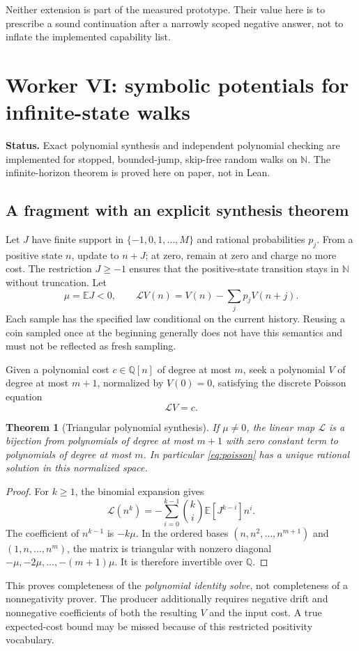 \documentclass[11pt,letterpaper]{article}
\newtheorem{theorem}{Theorem}[section]
\theoremstyle{definition}\newtheorem{definition}[theorem]{Definition}
\theoremstyle{remark}\newtheorem{remark}[theorem]{Remark}
\newcommand{\Q}{\mathbb Q}\newcommand{\R}{\mathbb R}\newcommand{\N}{\mathbb N}
\newcommand{\E}{\mathbb E}\newcommand{\Prob}{\mathbb P}
\newcommand{\status}[1]{\par\noindent\textbf{Status.} #1\par}
\begin{document}
Neither extension is part of the measured prototype. Their value here is to prescribe a sound continuation after a narrowly scoped negative answer, not to inflate the implemented capability list.

\section{Worker VI: symbolic potentials for infinite-state walks}
\status{Exact polynomial synthesis and independent polynomial checking are implemented for stopped, bounded-jump, skip-free random walks on $\N$. The infinite-horizon theorem is proved here on paper, not in Lean.}
\subsection{A fragment with an explicit synthesis theorem}
Let $J$ have finite support in $\{-1,0,1,\ldots,M\}$ and rational probabilities $p_j$. From a positive state $n$, update to $n+J$; at zero, remain at zero and charge no more cost. The restriction $J\ge-1$ ensures that the positive-state transition stays in $\N$ without truncation. Let
\[
 \mu=\E J<0,\qquad
 \mathcal L V(n)=V(n)-\sum_jp_jV(n+j).
\]
Each sample has the specified law conditional on the current history. Reusing a coin sampled once at the beginning generally does not have this semantics and must not be reflected as fresh sampling.

Given a polynomial cost $c\in\Q[n]$ of degree at most $m$, seek a polynomial $V$ of degree at most $m+1$, normalized by $V(0)=0$, satisfying the discrete Poisson equation
\begin{equation}\label{eq:poisson}
 \mathcal L V=c.
\end{equation}

\begin{theorem}[Triangular polynomial synthesis]\label{thm:triangular}
If $\mu\ne0$, the linear map $\mathcal L$ is a bijection from polynomials of degree at most $m+1$ with zero constant term to polynomials of degree at most $m$. In particular \eqref{eq:poisson} has a unique rational solution in this normalized space.
\end{theorem}
\begin{proof}
For $k\ge1$, the binomial expansion gives
\[
 \mathcal L(n^k)
 =-\sum_{i=0}^{k-1}\binom{k}{i}\E[J^{k-i}]n^i.
\]
The coefficient of $n^{k-1}$ is $-k\mu$. In the ordered bases $(n,n^2,\ldots,n^{m+1})$ and $(1,n,\ldots,n^m)$, the matrix is triangular with nonzero diagonal $-\mu,-2\mu,\ldots,-(m+1)\mu$. It is therefore invertible over $\Q$.
\end{proof}
This proves completeness of the \emph{polynomial identity solve}, not completeness of a nonnegativity prover. The producer additionally requires negative drift and nonnegative coefficients of both the resulting $V$ and the input cost. A true expected-cost bound may be missed because of this restricted positivity vocabulary.
\end{document}
